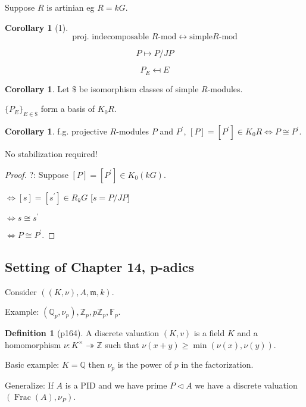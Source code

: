 \documentclass{article}
\theoremstyle{definition}
\newtheorem*{definition}{Definition}
\newtheorem{corollary}[theorem]{Corollary}
\begin{document}
Suppose \(R\) is artinian eg \(R = kG\).

\begin{corollary}
    [1]

    \[
        \text{proj. indecomposable } R\text{-mod} \leftrightarrow \text{simple} R\text{-mod}
    \]

    \[
        P \mapsto P / JP
    \]

    \[
        P_E \mapsfrom E
    \]
\end{corollary}

\begin{corollary}
    Let \(\$\) be isomorphism classes of simple \(R\)-modules.

    \(\{ P_E \}_{E \in \$}\) form a basis of \(K_0 R\).
\end{corollary}

\begin{corollary}
    f.g. projective \(R\)-modules \(P\) and \(P^{\prime}\), \([P]=[P^{\prime}] \in K_0 R \iff P \cong P^{\prime}\).

    No stabilization required!
\end{corollary}

\begin{proof}
    ?: Suppose \([P] = [P^{\prime}] \in K_0(kG)\).

    \(\iff [s]=[s^{\prime}] \in R_k G\) [\(s = P / JP\)]

    \(\iff s \cong s^{\prime}\) 

    \(\iff P \cong P^{\prime}\).
\end{proof}

\subsection*{Setting of Chapter 14, p-adics}

Consider \(((K,\nu),A, \mathfrak{m}, k)\).

Example: \((\mathbb{Q}_p, \nu_p),\mathbb{Z}_p, p \mathbb{Z}_p, \mathbb{F}_p\).

\begin{definition}
    [p164] A discrete valuation \((K,v)\) is a field \(K\) and a homomorphism \(\nu: K^\times \twoheadrightarrow \mathbb{Z}\) such that \(\nu(x + y) \geq \min(\nu(x), \nu(y))\).
\end{definition}

Basic example: \(K = \mathbb{Q}\) then \(\nu_p\) is the power of \(p\) in the factorization.

Generalize: If \(A\) is a PID and we have prime \(P \triangleleft A\) we have a discrete valuation \((\operatorname{Frac}(A), \nu_P)\).
\end{document}
